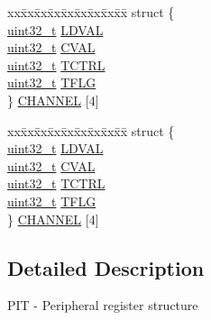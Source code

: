 \begin{DoxyCompactItemize}
\begin{tabbing}
\end{tabbing}\item 
\begin{tabbing}
xx\=xx\=xx\=xx\=xx\=xx\=xx\=xx\=xx\=\kill
struct \{\\
\>\hyperlink{_p_e___types_8h_a33594304e786b158f3fb30289278f5af}{uint32\_t} \hyperlink{struct_p_i_t___mem_map_ad664bbe0f8b53ee1e533727db4da3fb2}{LDVAL}\\
\>\hyperlink{_p_e___types_8h_a33594304e786b158f3fb30289278f5af}{uint32\_t} \hyperlink{struct_p_i_t___mem_map_a7d3d1a5913a28cfb4ca0e120ebf37087}{CVAL}\\
\>\hyperlink{_p_e___types_8h_a33594304e786b158f3fb30289278f5af}{uint32\_t} \hyperlink{struct_p_i_t___mem_map_a567cdea5c7d615341f95f1438020a7e1}{TCTRL}\\
\>\hyperlink{_p_e___types_8h_a33594304e786b158f3fb30289278f5af}{uint32\_t} \hyperlink{struct_p_i_t___mem_map_add88e740d4ec7a83e66cf9ad79cd027a}{TFLG}\\
\} \hyperlink{struct_p_i_t___mem_map_a778c6f29ecaa2318d34e207de33609a5}{CHANNEL} \mbox{[}4\mbox{]}\\

\end{tabbing}\item 
\begin{tabbing}
xx\=xx\=xx\=xx\=xx\=xx\=xx\=xx\=xx\=\kill
struct \{\\
\>\hyperlink{_p_e___types_8h_a33594304e786b158f3fb30289278f5af}{uint32\_t} \hyperlink{struct_p_i_t___mem_map_ad664bbe0f8b53ee1e533727db4da3fb2}{LDVAL}\\
\>\hyperlink{_p_e___types_8h_a33594304e786b158f3fb30289278f5af}{uint32\_t} \hyperlink{struct_p_i_t___mem_map_a7d3d1a5913a28cfb4ca0e120ebf37087}{CVAL}\\
\>\hyperlink{_p_e___types_8h_a33594304e786b158f3fb30289278f5af}{uint32\_t} \hyperlink{struct_p_i_t___mem_map_a567cdea5c7d615341f95f1438020a7e1}{TCTRL}\\
\>\hyperlink{_p_e___types_8h_a33594304e786b158f3fb30289278f5af}{uint32\_t} \hyperlink{struct_p_i_t___mem_map_add88e740d4ec7a83e66cf9ad79cd027a}{TFLG}\\
\} \hyperlink{struct_p_i_t___mem_map_a71809d1da7af7689c1171788e023b6ef}{CHANNEL} \mbox{[}4\mbox{]}\\

\end{tabbing}\end{DoxyCompactItemize}


\subsection{Detailed Description}
P\+IT -\/ Peripheral register structure 

